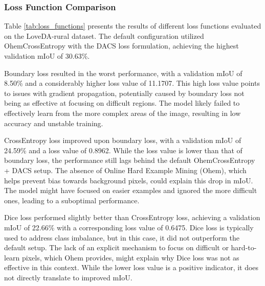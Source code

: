 \documentclass{article}
\begin{document}
	\begin{multicols}{2}





        \subsubsection{Loss Function Comparison}
        \justifying
        Table \ref{tab:loss_functions} presents the results of different loss functions evaluated on the LoveDA-rural dataset. The default configuration utilized OhemCrossEntropy with the DACS loss formulation, achieving the highest validation mIoU of 30.63\%. 
        
        Boundary loss resulted in the worst performance, with a validation mIoU of 8.50\% and a considerably higher loss value of 11.1707. This high loss value points to issues with gradient propagation, potentially caused by boundary loss not being as effective at focusing on difficult regions. The model likely failed to effectively learn from the more complex areas of the image, resulting in low accuracy and unstable training.

        CrossEntropy loss improved upon boundary loss, with a validation mIoU of 24.59\% and a loss value of 0.8962. While the loss value is lower than that of boundary loss, the performance still lags behind the default OhemCrossEntropy + DACS setup. The absence of Online Hard Example Mining (Ohem), which helps prevent bias towards background pixels, could explain this drop in mIoU. The model might have focused on easier examples and ignored the more difficult ones, leading to a suboptimal performance.
        
        Dice loss performed slightly better than CrossEntropy loss, achieving a validation mIoU of 22.66\% with a corresponding loss value of 0.6475. Dice loss is typically used to address class imbalance, but in this case, it did not outperform the default setup. The lack of an explicit mechanism to focus on difficult or hard-to-learn pixels, which Ohem provides, might explain why Dice loss was not as effective in this context. While the lower loss value is a positive indicator, it does not directly translate to improved mIoU.

        
        \begin{center}
            \label{tab:loss_functions}
        \end{center}



\end{multicols}
\end{document}

